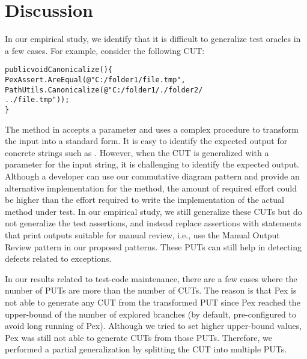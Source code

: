 \section{Discussion} 
\label{sec:limitations}

In our empirical study, we identify that it is difficult to generalize test oracles in a few cases. For example, consider the following CUT:\vspace*{-1.5ex}

\begin{CodeOut}
\begin{alltt}
public void Canonicalize() \{
\hspace*{0.1in}PexAssert.AreEqual(@"C:/folder1/file.tmp",
\hspace*{0.3in}PathUtils.Canonicalize(@"C:/folder1/./folder2/
\hspace*{0.3in}../file.tmp")); 
\}
\end{alltt}
\end{CodeOut} \vspace*{-1.5ex}

\noindent The  method in  accepts a  parameter and uses a complex procedure to transform the input into a standard form. It is easy to identify the expected output for concrete strings such as . However, when the CUT is generalized with a parameter for the input string, it is challenging to identify the expected output. Although a developer can use our commutative diagram pattern and provide an alternative implementation for the  method, the amount of required effort could be higher than the effort required to write the implementation of the actual method under test. In our empirical study, we still generalize these CUTs but do not generalize the test assertions, and instead replace assertions with statements that print outputs suitable for manual review, i.e., use the Manual Output Review pattern in our proposed patterns. These PUTs can still help in detecting defects related to exceptions.

In our results related to test-code maintenance, there are a few cases where the number of PUTs are more than the number of CUTs. The reason is that Pex is not able to generate any CUT from the transformed PUT since Pex reached the upper-bound of the number of explored branches (by default, pre-configured to avoid long running of Pex). Although we tried to set higher upper-bound values, Pex was still not able to generate CUTs from those PUTs. Therefore, we performed a partial generalization by splitting the CUT into multiple PUTs.


